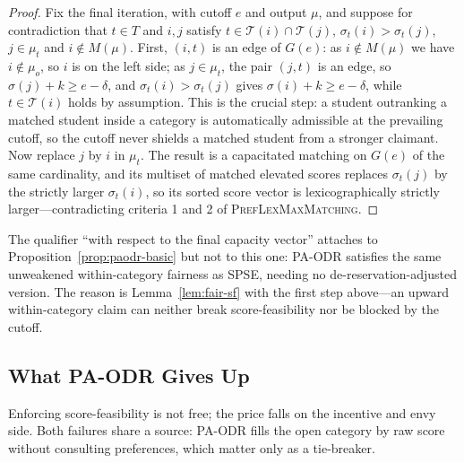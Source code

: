 \documentclass[runningheads]{llncs}
\newcommand{\T}{\mathcal{T}}
\begin{document}
\begin{proof}
Fix the final iteration, with cutoff $e$ and output $\mu$, and suppose for contradiction that $t\in T$ and $i,j$ satisfy $t\in\T(i)\cap\T(j)$, $\sigma_t(i)>\sigma_t(j)$, $j\in\mu_t$ and $i\notin M(\mu)$. First, $(i,t)$ is an edge of $G(e)$: as $i\notin M(\mu)$ we have $i\notin\mu_o$, so $i$ is on the left side; as $j\in\mu_t$, the pair $(j,t)$ is an edge, so $\sigma(j)+k\ge e-\delta$, and $\sigma_t(i)>\sigma_t(j)$ gives $\sigma(i)+k\ge e-\delta$, while $t\in\T(i)$ holds by assumption. This is the crucial step: a student outranking a matched student inside a category is automatically admissible at the prevailing cutoff, so the cutoff never shields a matched student from a stronger claimant. Now replace $j$ by $i$ in $\mu_t$. The result is a capacitated matching on $G(e)$ of the same cardinality, and its multiset of matched elevated scores replaces $\sigma_t(j)$ by the strictly larger $\sigma_t(i)$, so its sorted score vector is lexicographically strictly larger---contradicting criteria 1 and 2 of \textsc{PrefLexMaxMatching}.
\end{proof}

The qualifier ``with respect to the final capacity vector'' attaches to Proposition~\ref{prop:paodr-basic} but not to this one: PA-ODR satisfies the same unweakened within-category fairness as SPSE, needing no de-reservation-adjusted version. The reason is Lemma~\ref{lem:fair-sf} with the first step above---an upward within-category claim can neither break score-feasibility nor be blocked by the cutoff.

\subsection{What PA-ODR Gives Up}
\label{sec:paodr-limits}

Enforcing score-feasibility is not free; the price falls on the incentive and envy side. Both failures share a source: PA-ODR fills the open category by raw score without consulting preferences, which matter only as a tie-breaker.
\end{document}
